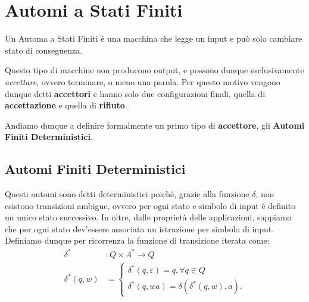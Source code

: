 \section{Automi a Stati Finiti}

Un Automa a Stati Finiti è una macchina che legge un input e può solo cambiare stato di conseguenza.

Questo tipo di macchine non producono output, e possono dunque esclusivamente \textit{accettare}, ovvero terminare, o meno una parola. Per questo motivo vengono dunque detti \textbf{accettori} e hanno solo due configurazioni finali, quella di \textbf{accettazione} e quella di \textbf{rifiuto}.

Andiamo dunque a definire formalmente un primo tipo di \textbf{accettore}, gli \textbf{Automi Finiti Deterministici}.

\subsection{Automi Finiti Deterministici}


Questi automi sono detti deterministici poiché, grazie alla funzione \(\delta\), non esistono transizioni ambigue, ovvero per ogni stato e simbolo di input è definito un unico stato successivo. In oltre, dalle proprietà delle applicazioni, sappiamo che per ogni stato dev'essere associata un istruzione per simbolo di input.
Definiamo dunque per ricorrenza la funzione di transizione iterata come:
\begin{equation}
  \begin{split}
    \delta^*&: Q \times A^* \rightarrow Q \\
    \delta^*(q, w) &= \begin{cases}
      \delta^*(q, \varepsilon) = q, \forall q \in Q\\
      \delta^*(q, wa) = \delta(\delta^*(q,w),a).
    \end{cases}
  \end{split}
\end{equation}

